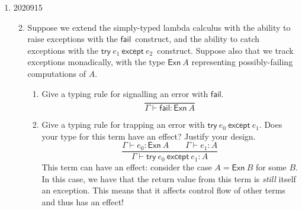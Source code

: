 \documentclass[10pt,\jkfside,a4paper]{article}
\begin{document}
\begin{enumerate}
\begin{examquestion}{2021}{9}{15}
\begin{enumerate}[label=(\alph*)]
\begin{enumerate}
            \end{enumerate}

        \end{enumerate}

    \end{examquestion}

    \item

    \begin{examquestion}{2020}{9}{15}

        \newcommand{\fail}{\ensuremath{\mathsf{fail}}}
        \newcommand{\try}[2]{\ensuremath{\mathsf{try}\ #1\ \mathsf{except}\ #2}}
        \newcommand{\exn}[1]{\ensuremath{\mathsf{Exn}\ #1}}

        \begin{enumerate}[label=(\alph*)]

            \setcounter{enumii}{1}

            \item Suppose we extend the simply-typed lambda calculus with the ability to raise exceptions with the \fail\ construct, and the ability to catch exceptions with the \try{e_1}{e_2}\ construct.
            Suppose also that we track exceptions monadically, with the type \exn{A} representing possibly-failing computations of $A$.

            \begin{enumerate}[label=(\roman*)]

                \item Give a typing rule for signalling an error with \fail.
                \[
                    \dfrac{
                    }{
                    \Gamma \vdash \fail: \exn{A}
                    }
                \]

                \item Give a typing rule for trapping an error with \try{e_0}{e_1}. Does your type for this term have an effect? Justify your design.
                \[
                    \dfrac{
                    \Gamma \vdash e_0: \exn{A} \qquad \Gamma \vdash e_1: A
                    }{
                        \Gamma \vdash \try{e_0}{e_1} : A
                    }
                \]
                This term can have an effect: consider the case $A = \exn{B}$ for some $B$. In this case, we have that the return value from this term is \textit{still} itself an exception. This means that it
                affects control flow of other terms and thus has an effect!

            \end{enumerate}

        \end{enumerate}

    \end{examquestion}

\end{enumerate}
\end{document}
